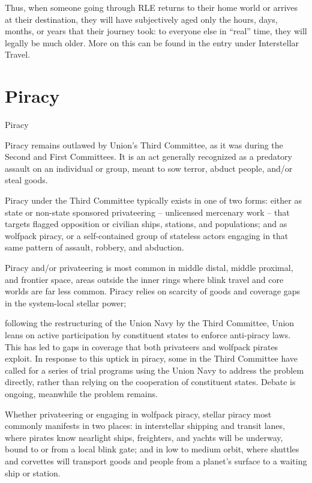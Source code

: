 Thus, when someone going through RLE returns to their home world or arrives at their  
destination, they will have subjectively aged only the hours, days, months, or years that their  
journey took: to everyone else in “real” time, they will legally be much older. More on this can be  
found in the entry under Interstellar Travel. 
 
\section{Piracy}
Piracy   

Piracy remains outlawed by Union’s Third Committee, as it was during the Second and First  
Committees. It is an act generally recognized as a predatory assault on an individual or group,  
meant to sow terror, abduct people, and/or steal goods. 
 

Piracy under the Third Committee typically exists in one of two forms: either as state or non-state  
sponsored privateering -- unlicensed mercenary work -- that targets flagged opposition or  
civilian ships, stations, and populations; and as wolfpack piracy, or a self-contained group of  
stateless actors engaging in that same pattern of assault, robbery, and abduction. 
 

Piracy and/or privateering is most common in middle distal, middle proximal, and frontier space,  
areas outside the inner rings where blink travel and core worlds are far less common. Piracy  
relies on scarcity of goods and coverage gaps in the system-local stellar power;
 
following the restructuring of the Union Navy by the Third Committee, Union leans on active  
participation by constituent states to enforce anti-piracy laws. This has led to gaps in coverage  
that both privateers and wolfpack pirates exploit. In response to this uptick in piracy, some in the  
Third Committee have called for a series of trial programs using the Union Navy to address the  
problem directly, rather than relying on the cooperation of constituent states. Debate is ongoing,  
meanwhile the problem remains. 
 

Whether privateering or engaging in wolfpack piracy, stellar piracy most commonly manifests in  
two places: in interstellar shipping and transit lanes, where pirates know nearlight ships,  
freighters, and yachts will be underway, bound to or from a local blink gate; and in low to  
medium orbit, where shuttles and corvettes will transport goods and people from a planet’s  
surface to a waiting ship or station. 
 

